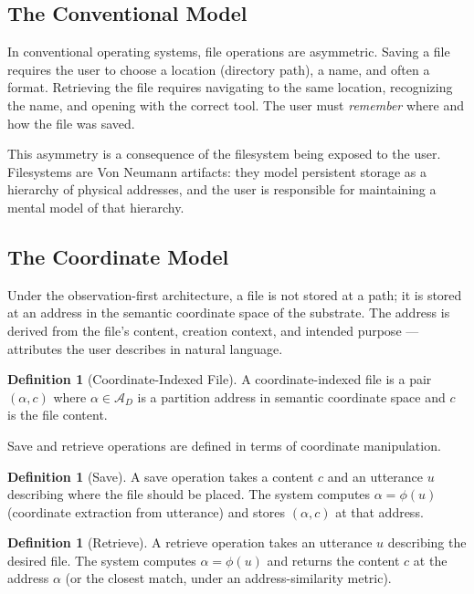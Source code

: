 \documentclass[11pt,a4paper]{article}
\theoremstyle{definition}
\newtheorem{definition}[theorem]{Definition}
\theoremstyle{remark}
\newcommand{\Ac}{\mathcal{A}}
\begin{document}
\subsection{The Conventional Model}

In conventional operating systems, file operations are asymmetric. Saving a file requires the user to choose a location (directory path), a name, and often a format. Retrieving the file requires navigating to the same location, recognizing the name, and opening with the correct tool. The user must \emph{remember} where and how the file was saved.

This asymmetry is a consequence of the filesystem being exposed to the user. Filesystems are Von Neumann artifacts: they model persistent storage as a hierarchy of physical addresses, and the user is responsible for maintaining a mental model of that hierarchy.

\subsection{The Coordinate Model}

Under the observation-first architecture, a file is not stored at a path; it is stored at an address in the semantic coordinate space of the substrate. The address is derived from the file's content, creation context, and intended purpose --- attributes the user describes in natural language.

\begin{definition}[Coordinate-Indexed File]
\label{def:cifile}
A coordinate-indexed file is a pair $(\alpha, c)$ where $\alpha \in \Ac_D$ is a partition address in semantic coordinate space and $c$ is the file content.
\end{definition}

Save and retrieve operations are defined in terms of coordinate manipulation.

\begin{definition}[Save]
A save operation takes a content $c$ and an utterance $u$ describing where the file should be placed. The system computes $\alpha = \phi(u)$ (coordinate extraction from utterance) and stores $(\alpha, c)$ at that address.
\end{definition}

\begin{definition}[Retrieve]
A retrieve operation takes an utterance $u$ describing the desired file. The system computes $\alpha = \phi(u)$ and returns the content $c$ at the address $\alpha$ (or the closest match, under an address-similarity metric).
\end{definition}
\end{document}
